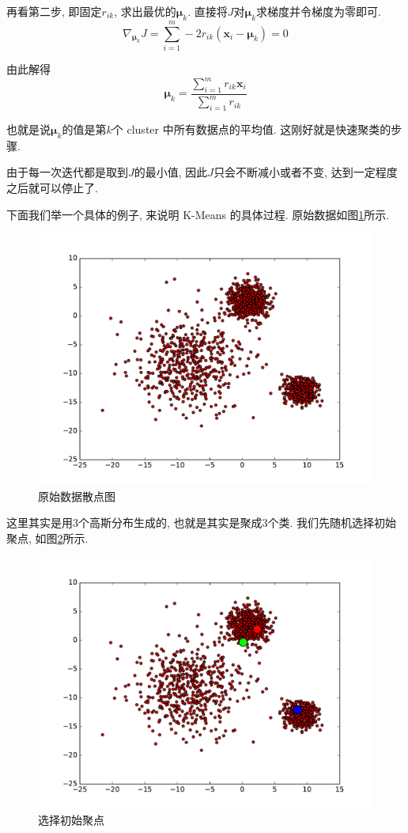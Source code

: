 \documentclass[a4paper,UTF8]{ctexart}
\theoremstyle{plain} \newtheorem{theorem}{定理}[section]
\theoremstyle{plain} \newtheorem{definition}{定义}[section]
\theoremstyle{plain} \newtheorem{lemma}{引理}[section]
\theoremstyle{plain} \newtheorem{proposition}{命题}[section]
\theoremstyle{plain} \newtheorem{example}{例}[section]
\theoremstyle{plain} \newtheorem{remark}{注}[section]
\theoremstyle{plain} \newtheorem{corollary}{推论}[section]
\begin{document}
再看第二步, 即固定$r_{ik}$, 求出最优的$\bm{\mu}_{k}$. 直接将$J$对$\bm{\mu}_{k}$求梯度并令梯度为零即可.
\begin{equation*}
\nabla_{\bm{\mu}_k} J = \sum_{i=1}^{m} -2 r_{ik} (\bm{x}_{i} - \bm{\mu}_{k}) = 0
\end{equation*}

由此解得
\begin{equation*}
\bm{\mu}_{k} = \frac{\sum_{i=1}^m r_{ik} \bm{x}_i}{\sum_{i=1}^{m} r_{ik}}
\end{equation*}

也就是说$\bm{\mu}_{k}$的值是第$k$个 cluster 中所有数据点的平均值. 这刚好就是快速聚类的步骤.

由于每一次迭代都是取到$J$的最小值, 因此$J$只会不断减小或者不变, 达到一定程度之后就可以停止了.

下面我们举一个具体的例子, 来说明 K-Means 的具体过程. 原始数据如图\ref{rowdata}所示.
\begin{figure}[!htb]
	\centering
	\includegraphics[width = 0.75 \textwidth]{rowdata.pdf}
	\caption{原始数据散点图}
	\label{rowdata}
\end{figure}

这里其实是用$3$个高斯分布生成的, 也就是其实是聚成$3$个类. 我们先随机选择初始聚点, 如图\ref{iter00}所示.
\begin{figure}[!htb]
	\centering
	\includegraphics[width = 0.75 \textwidth]{iter_00.pdf}
	\caption{选择初始聚点}
	\label{iter00}
\end{figure}
\end{document}
